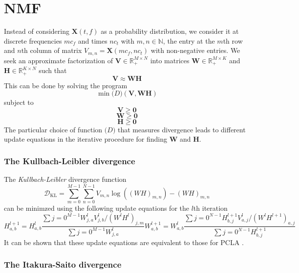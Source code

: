 \section{NMF}

Instead of considering $\boldsymbol{X}(t,f)$ as a probability distribution, we
consider it at discrete frequencies $mc_{f}$ and times $nc_{t}$ with $m,n \in
\mathbb{N}$, the entry at the $m$th row and $n$th column of matrix
$V_{m,n}=\boldsymbol{X}(mc_{f},nc_{t})$ with non-negative entries. We seek an
approximate factorization of $\boldsymbol{V} \in \mathbb{R}^{M \times N}_{+}$
into matrices $\boldsymbol{W} \in \mathbb{R}^{M \times K}_{+}$ and
$\boldsymbol{H} \in \mathbb{R}^{K \times N}_{+}$ such that
\[
    \boldsymbol{V} \approx \boldsymbol{W}\boldsymbol{H}
\]
This can be done by solving the program
\[
    \min \mathcal(D)(\boldsymbol{V},\boldsymbol{W}\boldsymbol{H})
\]
subject to
\[
    \boldsymbol{V} \geq \boldsymbol{0}
\]
\[
    \boldsymbol{W} \geq \boldsymbol{0}
\]
\[
    \boldsymbol{H} \geq \boldsymbol{0}
\]
The particular choice of function $\mathcal(D)$ that measures divergence leads
to different update equations in the iterative procedure for finding
$\boldsymbol{W}$ and $\boldsymbol{H}$.

\subsubsection{The Kullbach-Leibler divergence \cite{lee2001algorithms}}

The \textit{Kullbach-Leibler} divergence function
\[
    \mathcal{D}_{\text{KL}} =
    \sum_{m=0}^{M-1}\sum_{n=0}^{N-1} V_{m,n}\log((WH)_{m,n})-(WH)_{m,n}
\]
can be minimzed using the following update equations for the $l$th iteration
\[
    H_{a,b}^{l+1} =
    H_{a,b}^{l} \frac{\sum{j=0}^{M-1}W_{j,a}^{l}V_{j,b}^{l} / (W^{l}H^{l})_{j,m}}
    {\sum{j=0}^{M-1}W_{j,a}^{l}}
    W_{a,b}^{l+1} =
    W_{a,b}^{l} \frac{\sum{j=0}^{N-1}H_{b,j}^{l+1}V_{a,j}^{l} / (W^{l}H^{l+1})_{a,j}}
    {\sum{j=0}^{N-1}H_{b,j}^{l+1}}
\]
It can be shown that these update equations are equivalent to those for PCLA
\cite{shashanka2008probabilistic}.

\subsubsection{The Itakura-Saito divergence \cite{fevotte2009nonnegative}}

